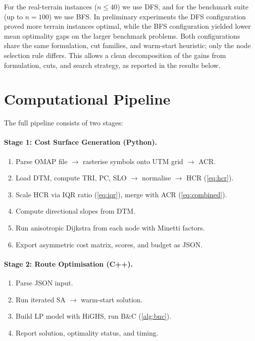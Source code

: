 \documentclass[11pt,a4paper]{article}
\begin{document}
For the real-terrain instances ($n \leq 40$) we use DFS, and for the benchmark suite (up to $n = 100$) we use BFS.
In preliminary experiments the DFS configuration proved more terrain instances optimal, while the BFS configuration yielded lower mean optimality gaps on the larger benchmark problems.
Both configurations share the same formulation, cut families, and warm-start heuristic; only the node selection rule differs.
This allows a clean decomposition of the gains from formulation, cuts, and search strategy, as reported in the results below.

\section{Computational Pipeline}
\label{sec:pipeline}

The full pipeline consists of two stages:

\paragraph{Stage 1: Cost Surface Generation (Python).}
\begin{enumerate}[nosep]
  \item Parse OMAP file $\to$ rasterise symbols onto UTM grid $\to$ ACR.
  \item Load DTM, compute TRI, PC, SLO $\to$ normalise $\to$ HCR (\cref{eq:hcr}).
  \item Scale HCR via IQR ratio (\cref{eq:iqr}), merge with ACR (\cref{eq:combined}).
  \item Compute directional slopes from DTM.
  \item Run anisotropic Dijkstra from each node with Minetti factors.
  \item Export asymmetric cost matrix, scores, and budget as JSON.
\end{enumerate}

\paragraph{Stage 2: Route Optimisation (C++).}
\begin{enumerate}[nosep]
  \item Parse JSON input.
  \item Run iterated SA $\to$ warm-start solution.
  \item Build LP model with HiGHS, run B\&C (\cref{alg:bnc}).
  \item Report solution, optimality status, and timing.
\end{enumerate}
\end{document}
